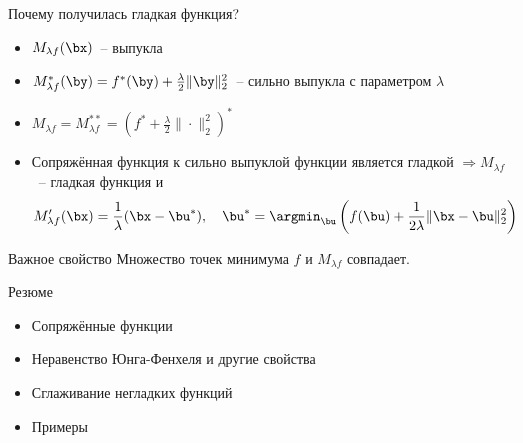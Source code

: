 \documentclass[12pt]{beamer}
\begin{document}
\begin{frame}{Почему получилась гладкая функция?}
\begin{itemize}
\item $M_{\lambda f}(\bx)$~-- выпукла
\item $M^*_{\lambda f}(\by) = f^*(\by) + \frac{\lambda}{2}\|\by\|_2^2$~-- сильно выпукла с параметром $\lambda$
\item $M_{\lambda f} = M^{**}_{\lambda f} = (f^* + \frac{\lambda}{2}\|\cdot \|_2^2)^*$
\item Сопряжённая функция к сильно выпуклой функции является гладкой $\Rightarrow M_{\lambda f}$~-- гладкая функция и 
\[
M'_{\lambda f}(\bx) = \frac{1}{\lambda} (\bx - \bu^*), \quad \bu^* = \argmin_{\bu} \left(f(\bu) + \frac{1}{2\lambda}\|\bx - \bu\|^2_2\right) 
\]
\end{itemize}

\begin{block}{Важное свойство}
Множество точек минимума $f$ и $M_{\lambda f}$ совпадает.
\end{block}

\end{frame}

\begin{frame}{Резюме}

\begin{itemize}
\item Сопряжённые функции
\item Неравенство Юнга-Фенхеля и другие свойства
\item Сглаживание негладких функций
\item Примеры
\end{itemize}

\end{frame}
\end{document}
